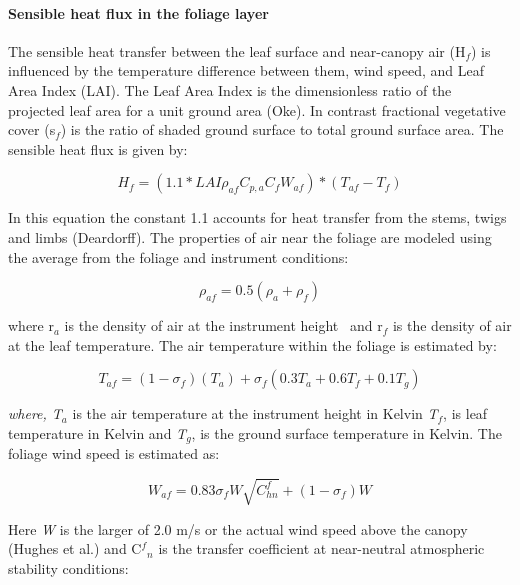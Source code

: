 \paragraph{Sensible heat flux in the foliage layer}\label{sensible-heat-flux-in-the-foliage-layer}

The sensible heat transfer between the leaf surface and near-canopy air (H\(_{f}\)) is influenced by the temperature difference between them, wind speed, and Leaf Area Index (LAI). The Leaf Area Index is the dimensionless ratio of the projected leaf area for a unit ground area (Oke). In contrast fractional vegetative cover (s\(_{f}\)) is the ratio of shaded ground surface to total ground surface area. The sensible heat flux is given by:

\begin{equation}
{H_f} = (1.1*LAI{\rho_{af}}{C_{p,a}}{C_f}{W_{af}})*({T_{af}} - {T_f})
\end{equation}

In this equation the constant 1.1 accounts for heat transfer from the stems, twigs and limbs (Deardorff). The properties of air near the foliage are modeled using the average from the foliage and instrument conditions:

\begin{equation}
{\rho_{af}} = 0.5({\rho_a} + {\rho_f})
\end{equation}

where r\(_{a}\) is the density of air at the instrument height ~and r\(_{f}\) is the density of air at the leaf temperature. The air temperature within the foliage is estimated by:

\begin{equation}
{T_{af}} = (1 - {\sigma_f})({T_a}) + {\sigma_f}\left( {0.3{T_a} + 0.6{T_f} + 0.1{T_g}} \right)
\end{equation}

\emph{where, T\(_{a}\)} is the air temperature at the instrument height in Kelvin \emph{T\(_{f}\)}, is leaf temperature in Kelvin and \emph{T\(_{g}\)}, is the ground surface temperature in Kelvin. The foliage wind speed is estimated as:

\begin{equation}
{W_{af}} = 0.83{\sigma_f}W\sqrt {C_{hn}^f}  + (1 - {\sigma_f})W
\end{equation}

Here \emph{W} is the larger of 2.0 m/s or the actual wind speed above the canopy (Hughes et al.) and C\(^{f}\)\(_{n}\) is the transfer coefficient at near-neutral atmospheric stability conditions:

